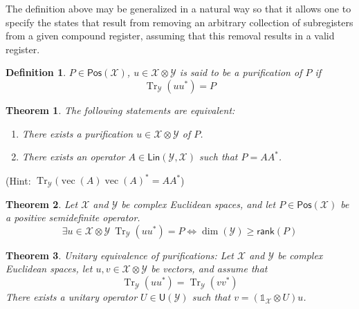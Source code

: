 \documentclass[aps,pra,onecolumn,notitlepage,superscriptaddress]{revtex4-1}
\newcommand{\spc}[1]{\mathcal{#1}}
\newcommand{\Lin}{\mathsf{Lin}}
\newcommand{\Pos}{\mathsf{Pos}}
\newcommand{\U}{\mathsf{U}}
\newcommand{\rank}{\mathsf{rank}}
\newcommand{\Tr}{\operatorname{Tr}}
\newcommand{\op}[1]{\operatorname{#1}}
\newcommand\I{\mathds{1}}
\newtheorem{theo}{Theorem}
\newtheorem{defi}{Definition}
\begin{document}
    The definition above may be generalized in a natural way so that it allows one to specify the states that result from removing an arbitrary collection of subregisters from a given compound register, assuming that this removal results in a valid register.

    \begin{defi}
        $P \in \Pos(\spc X)$, $u \in \spc X \otimes \spc Y$ is said to be a purification of $P$ if
        \begin{equation}
            \Tr_{\spc Y}(uu^*) = P
        \end{equation}
    \end{defi}

    \begin{theo}
        The following statements are equivalent:
        \begin{enumerate}
            \item There exists a purification $u \in \spc X \otimes \spc Y$ of $P$.
            \item There exists an operator $A \in \Lin(\spc Y, \spc X)$ such that $P = AA^*$. 
        \end{enumerate}
    \end{theo}
    
    (Hint: $\Tr_{\spc Y}(\op{vec}(A) \op{vec}(A)^* = AA^*$)

    \begin{theo}
        Let $\spc X$ and $\spc Y$ be complex Euclidean spaces, and let $P \in \Pos(\spc X)$ be a positive semidefinite operator. 
        \begin{equation}
            \exists u \in \spc X \otimes \spc Y \ \Tr_{\spc Y}(uu^*) = P \Longleftrightarrow \dim(\spc Y) \geq \rank(P)
        \end{equation}
    \end{theo}

    \begin{theo}
        Unitary equivalence of purifications:
        Let $\spc X$ and $\spc Y$ be complex Euclidean spaces, let $u,v \in \spc X \otimes \spc Y$ be vectors, and assume that
        \begin{equation}
            \Tr_{\spc Y}(uu^*) = \Tr_{\spc Y}(vv^*)
        \end{equation}
        There exists a unitary operator $U \in \U(\spc Y)$ such that $v = (\I_{\spc X} \otimes U)u$.
    \end{theo}
    
\end{document}
